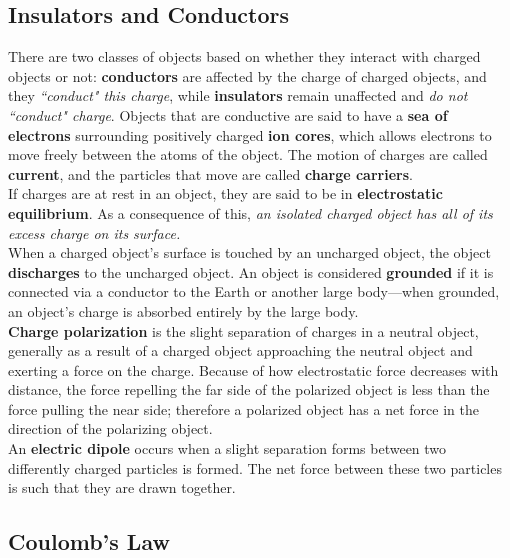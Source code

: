 \documentclass[12pt,letterpaper]{article}
\begin{document}
\subsection{Insulators and Conductors}

There are two classes of objects based on whether they interact with charged objects or not: \textbf{conductors} are affected by the charge of charged objects, and they \textit{``conduct" this charge}, while \textbf{insulators} remain unaffected and \textit{do not ``conduct" charge}. Objects that are conductive are said to have a \textbf{sea of electrons} surrounding positively charged \textbf{ion cores}, which allows electrons to move freely between the atoms of the object. The motion of charges are called \textbf{current}, and the particles that move are called \textbf{charge carriers}. \\

If charges are at rest in an object, they are said to be in \textbf{electrostatic equilibrium}. As a consequence of this, \textit{an isolated charged object has all of its excess charge on its surface.} \\

When a charged object's surface is touched by an uncharged object, the object \textbf{discharges} to the uncharged object. An object is considered \textbf{grounded} if it is connected via a conductor to the Earth or another large body---when grounded, an object's charge is absorbed entirely by the large body. \\

\textbf{Charge polarization} is the slight separation of charges in a neutral object, generally as a result of a charged object approaching the neutral object and exerting a force on the charge. Because of how electrostatic force decreases with distance, the force repelling the far side of the polarized object is less than the force pulling the near side; therefore a polarized object has a net force in the direction of the polarizing object. \\

An \textbf{electric dipole} occurs when a slight separation forms between two differently charged particles is formed. The net force between these two particles is such that they are drawn together. 

\subsection{Coulomb's Law}
\end{document}
